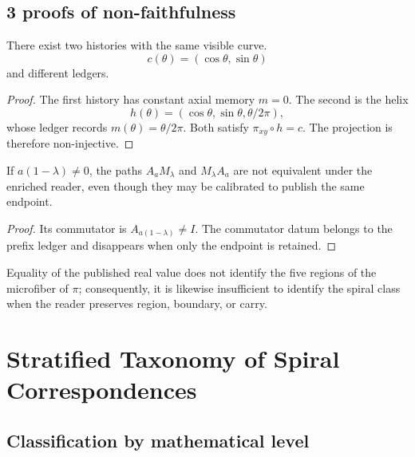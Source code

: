 \section{3 proofs of non-faithfulness}

\begin{proposition}
There exist two histories with the same visible curve.
\[
 c(\theta)=(\cos\theta,\sin\theta)
\]
and different ledgers.
\end{proposition}
\begin{proof}
The first history has constant axial memory \(m=0\). The second is
the helix
\[
 h(\theta)=(\cos\theta,\sin\theta,\theta/2\pi),
\]
whose ledger records \(m(\theta)=\theta/2\pi\). Both satisfy
\(\pi_{xy}\circ h=c\). The projection is therefore non-injective.
\end{proof}

\begin{proposition}
If \(a(1-\lambda)\neq0\), the paths \(A_aM_\lambda\) and
\(M_\lambda A_a\) are not equivalent under the enriched reader, even though
they may be calibrated to publish the same endpoint.
\end{proposition}
\begin{proof}
Its commutator is \(A_{a(1-\lambda)}\neq I\). The commutator datum
belongs to the prefix ledger and disappears when only the endpoint is retained.
\end{proof}

\begin{proposition}
Equality of the published real value does not identify the five regions of
the microfiber of \(\pi\); consequently, it is likewise insufficient to identify
the spiral class when the reader preserves region, boundary, or carry.
\end{proposition}

\chapter{Stratified Taxonomy of Spiral Correspondences}

\section{Classification by mathematical level}

